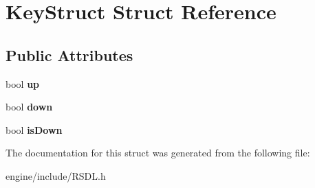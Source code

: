 \hypertarget{structKeyStruct}{
\section{KeyStruct Struct Reference}
\label{structKeyStruct}
}
\subsection*{Public Attributes}
\begin{DoxyCompactItemize}
\item 
\hypertarget{structKeyStruct_a91817c04bbf451a28fd5de1c9086d21e}{
bool {\bfseries up}}
\label{structKeyStruct_a91817c04bbf451a28fd5de1c9086d21e}

\item 
\hypertarget{structKeyStruct_a3dafff3adbc49fa64615328147c2a13c}{
bool {\bfseries down}}
\label{structKeyStruct_a3dafff3adbc49fa64615328147c2a13c}

\item 
\hypertarget{structKeyStruct_ae3308f8d6913936ba151ac9d57bb97bd}{
bool {\bfseries isDown}}
\label{structKeyStruct_ae3308f8d6913936ba151ac9d57bb97bd}

\end{DoxyCompactItemize}


The documentation for this struct was generated from the following file:\begin{DoxyCompactItemize}
\item 
engine/include/RSDL.h\end{DoxyCompactItemize}
